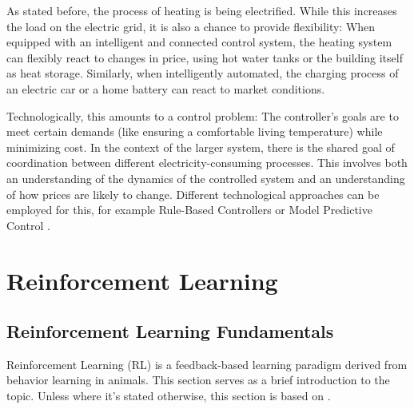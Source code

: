 As stated before, the process of heating is being electrified.
While this increases the load on the electric grid, it is also a chance to provide flexibility:
When equipped with an intelligent and connected control system, the heating system can flexibly react to changes in price, using hot water tanks or the building itself as heat storage.
Similarly, when intelligently automated, the charging process of an electric car or a home battery can react to market conditions.

Technologically, this amounts to a control problem:
The controller's goals are to meet certain demands (like ensuring a comfortable living temperature) while minimizing cost. In the context of the larger system, there is the shared goal of coordination between different electricity-consuming processes.
This involves both an understanding of the dynamics of the controlled system and an understanding of how prices are likely to change.
Different technological approaches can be employed for this, for example Rule-Based Controllers or Model Predictive Control \citep{li2021EnergyFlexibilityResidential}.

\section{Reinforcement Learning}



\subsection{Reinforcement Learning Fundamentals}
Reinforcement Learning (RL) is a feedback-based learning paradigm derived from behavior learning in animals.
This section serves as a brief introduction to the topic.
Unless where it's stated otherwise, this section is based on \cite{sutton2018ReinforcementLearningIntroduction}.

